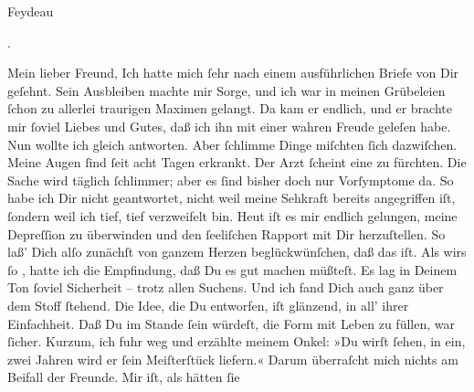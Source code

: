 \begin{ledgroupsized}[t]{13cm}
{{{\begin{otherlanguage}{french}
                              Feydeau\end{otherlanguage}.}}}\pend
           \pstart\center{}Mein lieber Freund,\pend\pstart
           Ich hatte mich ſehr nach einem ausführlichen Briefe von  Dir geſehnt. Sein Ausbleiben machte mir Sorge, und ich war in meinen
               Grübeleien ſchon zu allerlei traurigen Maximen gelangt. Da kam er endlich, und er
               brachte mir ſoviel Liebes und Gutes, daß ich ihn mit einer wahren Freude geleſen
               habe. Nun wollte ich gleich antworten. Aber ſchlimme Dinge miſchten ſich dazwiſchen.
               Meine Augen ſind ſeit acht Tagen erkrankt. Der Arzt ſcheint eine \textsc{\label{K_L02616-1v}\label{K_L02616-1h}} zu fürchten. {\pb}Die Sache wird täglich
               ſchlimmer; aber es ſind bisher doch nur Vorſymptome da. So habe ich Dir nicht
               geantwortet, nicht weil meine Sehkraft bereits angegriffen iſt, ſondern weil ich
               tief, tief verzweifelt bin. Heut iſt es mir endlich
               gelungen, meine Depreſſion zu überwinden und den ſeeliſchen Rapport mit Dir
               herzuſtellen.\pend
           \pstart
           So laß’ Dich alſo zunächſt von ganzem Herzen beglückwünſchen, daß das \label{K_L02616-2v}\label{K_L02616-2h} iſt. Als wirs ſo \label{K_L02616-3v}\label{K_L02616-3h}, hatte ich die Empfindung, daß Du es {\pb}gut machen müßteſt. Es lag in Deinem Ton ſoviel
               Sicherheit – trotz allen Suchens.  Und ich fand
               Dich auch ganz über dem Stoff ſtehend. Die Idee, die Du entworfen, iſt glänzend, in
               all’ ihrer Einfachheit. Daß Du im Stande ſein würdeſt, die Form mit Leben zu füllen,
               war ſicher. Kurzum, ich fuhr weg und erzählte meinem Onkel: »Du wirſt ſehen, in ein, zwei Jahren wird er ſein
               Meiſterſtück liefern.« Darum überraſcht mich nichts am Beifall der Freunde. Mir iſt, als hätten ſie

\end{ledgroupsized}
